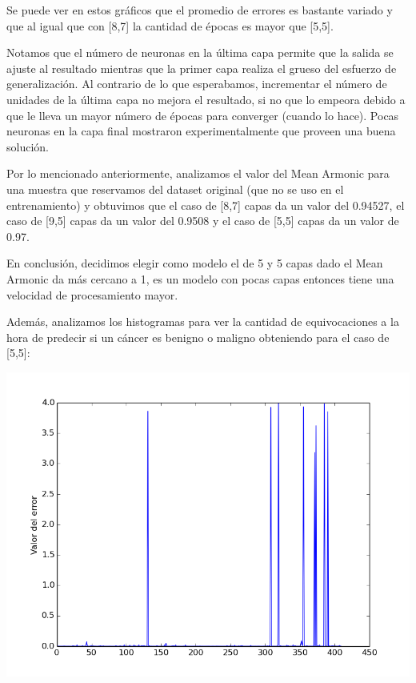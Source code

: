 Se puede ver en estos gráficos que el promedio de errores es bastante variado y que al igual que con [8,7] la cantidad de épocas es mayor que [5,5].

Notamos que el número de neuronas en la última capa permite que la salida se ajuste al resultado mientras que la primer capa realiza el grueso del esfuerzo de generalización. Al contrario de lo que esperabamos, incrementar el número de unidades de la última capa no mejora el resultado, si no que lo empeora debido a que le lleva un mayor número de épocas para converger (cuando lo hace). Pocas neuronas en la capa final mostraron experimentalmente que proveen una buena solución.

Por lo mencionado anteriormente, analizamos el valor del Mean Armonic para una muestra que reservamos del dataset original (que no se uso en el entrenamiento) y obtuvimos que el caso de [8,7] capas da un valor del 0.94527, el caso de [9,5] capas da un valor del 0.9508 y el caso de [5,5] capas da un valor de 0.97.

En conclusión, decidimos elegir como modelo el de 5 y 5 capas dado el Mean Armonic da más cercano a 1, es un modelo con pocas capas entonces tiene una velocidad de procesamiento mayor.

\newpage

Además, analizamos los histogramas para ver la cantidad de equivocaciones a la hora de predecir si un cáncer es benigno o maligno obteniendo para el caso de [5,5]:

\begin{center}
\includegraphics[scale=0.4]{img/histogramaej155}
\end{center}

